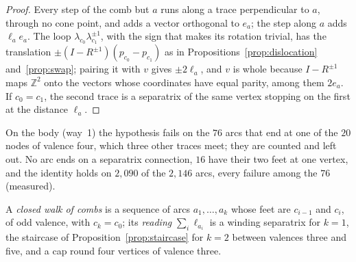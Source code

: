 \documentclass[11pt,a4paper]{article}
\newcommand{\Z}{\mathbb{Z}}
\begin{document}
\begin{proof}
Every step of the comb but $a$ runs along a trace perpendicular to $a$, through
no cone point, and adds a vector orthogonal to $e_a$; the step along $a$ adds
$\ell_a e_a$. The loop $\lambda_{c_0} \lambda_{c_1}^{\pm1}$, with the sign that
makes its rotation trivial, has the translation $\pm(I - R^{\pm1})(p_{c_0} -
p_{c_1})$ as in Propositions~\ref{prop:dislocation} and~\ref{prop:swap};
pairing it with $v$ gives $\pm 2\ell_a$, and $v$ is whole because $I -
R^{\pm1}$ maps $\Z^2$ onto the vectors whose coordinates have equal parity,
among them $2e_a$. If $c_0 = c_1$, the second trace is a separatrix of the same
vertex stopping on the first at the distance $\ell_a$.
\end{proof}

On the body (way~1) the hypothesis fails on the $76$ arcs that end at one of
the $20$ nodes of valence four, which three other traces meet; they are counted
and left out. No arc ends on a separatrix connection, $16$ have their two feet
at one vertex, and the identity holds on $2{,}090$ of the $2{,}146$ arcs, every
failure among the $76$ (measured).

A \emph{closed walk of combs} is a sequence of arcs $a_1, \dots, a_k$ whose
feet are $c_{i-1}$ and $c_i$, of odd valence, with $c_k = c_0$; its
\emph{reading} $\sum_i \ell_{a_i}$ is a winding separatrix for $k = 1$, the
staircase of Proposition~\ref{prop:staircase} for $k = 2$ between valences
three and five, and a cap round four vertices of valence three.
\end{document}
